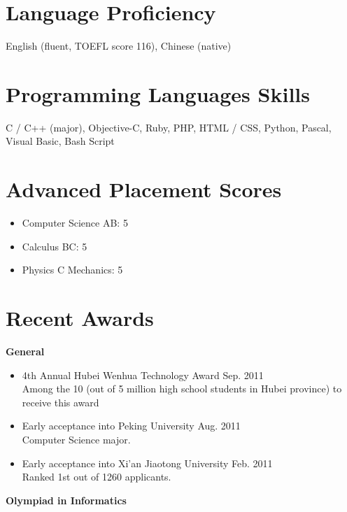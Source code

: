 \documentclass[margin]{res}
\begin{document}
 
\begin{resume} 

\section{Language Proficiency}
English (fluent, TOEFL score 116), 
Chinese (native)

\section{Programming Languages Skills}
C / C++ (major), 
Objective-C, 
Ruby, 
PHP, 
HTML / CSS, 
Python, 
Pascal, 
Visual Basic, 
Bash Script

\section{Advanced Placement Scores}

\begin{itemize}
    \item{Computer Science AB: 5}
    \item{Calculus BC: 5}
    \item{Physics C Mechanics: 5}
\end{itemize}

\section{Recent Awards}

{\bf General}

\begin{itemize}
    \item{4th Annual Hubei Wenhua Technology Award \hfill Sep. 2011 \\
          Among the 10 (out of 5 million high school students in Hubei province) to receive this award}
    \item{Early acceptance into Peking University \hfill Aug. 2011 \\
          Computer Science major. }
    \item{Early acceptance into Xi'an Jiaotong University \hfill Feb. 2011 \\
          Ranked 1st out of 1260 applicants. }
\end{itemize}

{\bf Olympiad in Informatics}


\end{resume}
\end{document}
